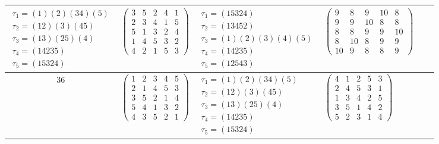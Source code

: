 \begin{longtable}{|c|p{2.7cm}|p{2.7cm}|p{2.7cm}|p{2.7cm}|p{3.3cm}|}
    $\begin{array}{l}\tau_{1}=(1)(2)(34)(5)\\ \tau_{2}=(12)(3)(45)\\ \tau_{3}=(13)(25)(4)\\ \tau_{4}=(14235)\\ \tau_{5}=(15324)\end{array}$     &
    $\begin{pmatrix}3&5&2&4&1\\2&3&4&1&5\\5&1&3&2&4\\1&4&5&3&2\\4&2&1&5&3\end{pmatrix}$                                                         &
    $\begin{array}{l}\tau_{1}=(15324)\\ \tau_{2}=(13452)\\ \tau_{3}=(1)(2)(3)(4)(5)\\ \tau_{4}=(14235)\\ \tau_{5}=(12543)\end{array}$           &
    $\begin{pmatrix}9&8&9&10&8\\9&9&10&8&8\\8&8&9&9&10\\8&10&8&9&9\\10&9&8&8&9\end{pmatrix}$                                                                                                                                \\
    \hline
    36                                                                                                                                          &
    $\begin{pmatrix}1&2&3&4&5\\2&1&4&5&3\\3&5&2&1&4\\5&4&1&3&2\\4&3&5&2&1\end{pmatrix}$                                                         &
    $\begin{array}{l}\tau_{1}=(1)(2)(34)(5)\\ \tau_{2}=(12)(3)(45)\\ \tau_{3}=(13)(25)(4)\\ \tau_{4}=(14235)\\ \tau_{5}=(15324)\end{array}$     &
    $\begin{pmatrix}4&1&2&5&3\\2&4&5&3&1\\1&3&4&2&5\\3&5&1&4&2\\5&2&3&1&4\end{pmatrix}$                                                         &

\end{longtable}
